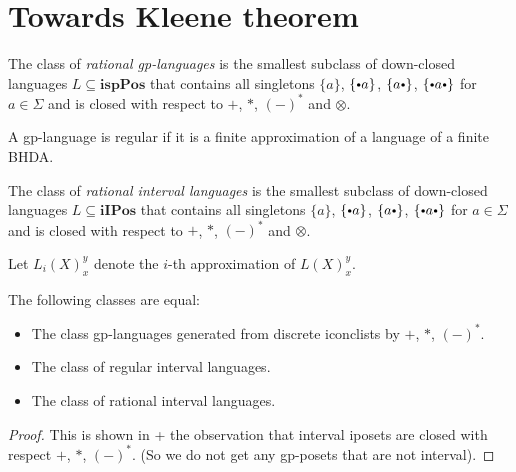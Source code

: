 \documentclass[a4paper,english]{lipics-v2021}
\begin{document}

\section{Towards Kleene theorem}

\def\ispPos{\mathbf{ispPos}}
\def\iIPos{\mathbf{iIPos}}

\begin{definition}
	The class of \emph{rational gp-languages} is the smallest  subclass of down-closed languages $L\subseteq \ispPos$ that contains all singletons $\{a\}$, $\{\ibullet a\}$, $\{a \ibullet\}$, $\{\ibullet a\ibullet\}$ for $a\in \Sigma$ and is closed with respect to $+$, $*$, $(-)^*$ and $\otimes$.
\end{definition}

\begin{definition}	
	A gp-language is regular if it is a finite approximation of a language of a finite BHDA.
\end{definition}

\begin{definition}
	The class of \emph{rational interval languages} is the smallest  subclass of down-closed languages $L\subseteq \iIPos$ that contains all singletons $\{a\}$, $\{\ibullet a\}$, $\{a \ibullet\}$, $\{\ibullet a\ibullet\}$ for $a\in \Sigma$ and is closed with respect to $+$, $*$, $(-)^*$ and $\otimes$.
\end{definition}

Let $L_i(X)_x^y$ denote the $i$-th approximation of $L(X)_x^y$.

\begin{lemma}
\label{l:hdalang-is-gp}
	The following classes are equal:
	\begin{itemize}
	\item
		The class gp-languages generated from discrete iconclists by $+$, $*$, $(-)^*$.
	\item	
		The class of regular interval languages.
	\item
		The class of rational interval languages.
	\end{itemize}
\end{lemma}
\begin{proof}
	This is shown in \cite{FJSZ_Kleene} + the observation that interval iposets are closed with respect $+$, $*$, $(-)^*$. (So we do not get any gp-posets that are not interval).
\end{proof}
\end{document}
